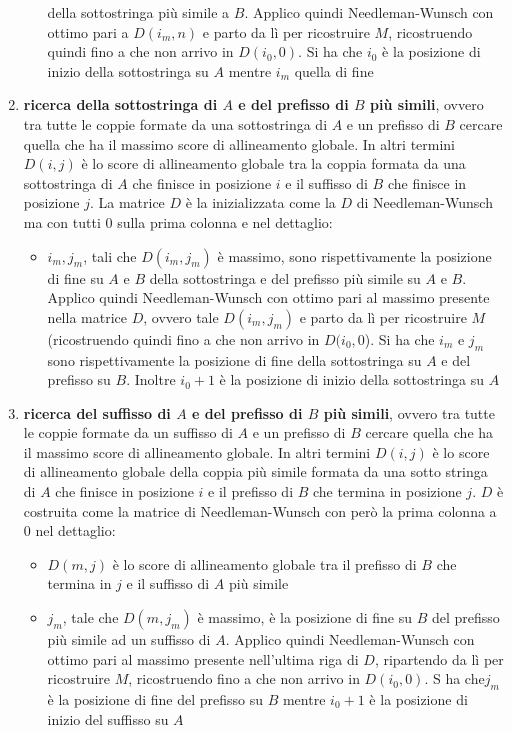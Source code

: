 \documentclass[a4paper,12pt, oneside]{book}
\begin{document}
\begin{enumerate}
\begin{itemize}
    della sottostringa più simile a $B$. Applico quindi Needleman-Wunsch con
    ottimo pari a $D(i_m,n)$ e parto da lì per ricostruire $M$, ricostruendo
    quindi fino a che non arrivo in $D(i_0,0)$. Si ha che $i_0$ è la posizione
    di inizio della sottostringa su $A$ mentre $i_m$ quella di fine
  \end{itemize} 
  \item \textbf{ricerca della sottostringa di $A$ e del prefisso di $B$ più
    simili}, ovvero tra tutte le coppie formate da una sottostringa di $A$ e un
  prefisso di $B$ cercare quella che ha il massimo score di allineamento
  globale.  In altri termini $D(i,j)$ è lo score di
  allineamento globale tra la coppia formata da una sottostringa di $A$ che
  finisce in posizione $i$ e il suffisso di $B$ che finisce in posizione $j$.
  La matrice $D$ è la inizializzata come la $D$ di 
  Needleman-Wunsch ma con tutti $0$ sulla prima colonna e
  nel dettaglio:  
  \begin{itemize}
    \item $i_m,j_m$, tali che $D(i_m,j_m)$ è massimo, sono rispettivamente la
    posizione di fine su $A$ e $B$ della sottostringa e del prefisso più simile
    su $A$ e $B$. Applico quindi Needleman-Wunsch con ottimo pari al
    massimo presente nella matrice $D$, ovvero tale $D(i_m,j_m)$ e parto da lì
    per ricostruire $M$ (ricostruendo quindi fino a che non arrivo in
    $D(i_0,0$). Si ha che $i_m$ e $j_m$ sono rispettivamente la posizione di fine
    della sottostringa su $A$ e del prefisso su $B$. Inoltre $i_0+1$ è la
    posizione di inizio della sottostringa su $A$
  \end{itemize}
  \item \textbf{ricerca del suffisso di $A$ e del prefisso di $B$ più simili},
  ovvero tra tutte le coppie formate da un suffisso di $A$ e un prefisso di $B$
  cercare quella che ha il massimo score di allineamento globale. In altri
  termini $D(i,j)$ è lo score di allineamento globale della coppia più simile
  formata da una sotto stringa di $A$ che finisce in posizione $i$ e il prefisso
  di $B$ che termina in posizione $j$. $D$ è costruita come la matrice di
  Needleman-Wunsch con però la prima colonna a 0 nel dettaglio: 
  \begin{itemize}
    \item $D(m,j)$ è lo score di allineamento globale tra il prefisso di $B$ che
    termina in $j$ e il suffisso di $A$ più simile
    \item $j_m$, tale che $D(m,j_m)$ è massimo, è la posizione di fine su $B$
    del prefisso più simile ad un suffisso di $A$. Applico quindi
    Needleman-Wunsch con ottimo pari al massimo presente 
    nell'ultima riga di $D$, ripartendo da lì per ricostruire $M$,
    ricostruendo fino a che non arrivo in $D(i_0,0)$. S ha che$j_m$ è la
    posizione di fine del prefisso su $B$ mentre $i_0+1$ è la posizione di
    inizio del suffisso su $A$
  \end{itemize} 
\end{enumerate}
\end{document}
